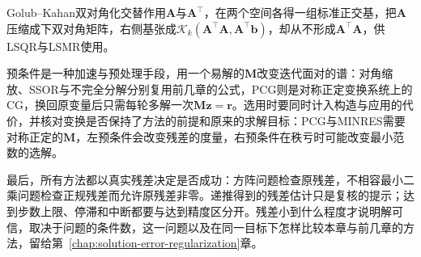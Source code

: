 Golub--Kahan双对角化交替作用$\bm A$与$\bm A^\top$，在两个空间各得一组标准正交基，把$\bm A$压缩成下双对角矩阵，右侧基张成$\mathcal K_k(\bm A^\top\bm A,\bm A^\top\bm b)$，却从不形成$\bm A^\top\bm A$，供LSQR与LSMR使用。

预条件是一种加速与预处理手段，用一个易解的$\bm M$改变迭代面对的谱：对角缩放、SSOR与不完全分解分别复用前几章的公式，PCG则是对称正定变换系统上的CG，换回原变量后只需每轮多解一次$\bm M\bm z=\bm r$。选用时要同时计入构造与应用的代价，并核对变换是否保持了方法的前提和原来的求解目标：PCG与MINRES需要对称正定的$\bm M$，左预条件会改变残差的度量，右预条件在秩亏时可能改变最小范数的选解。

最后，所有方法都以真实残差决定是否成功：方阵问题检查原残差，不相容最小二乘问题检查正规残差而允许原残差非零。递推得到的残差估计只是复核的提示；达到步数上限、停滞和中断都要与达到精度区分开。残差小到什么程度才说明解可信，取决于问题的条件数，这一问题以及在同一目标下怎样比较本章与前几章的方法，留给第~\ref{chap:solution-error-regularization}章。
